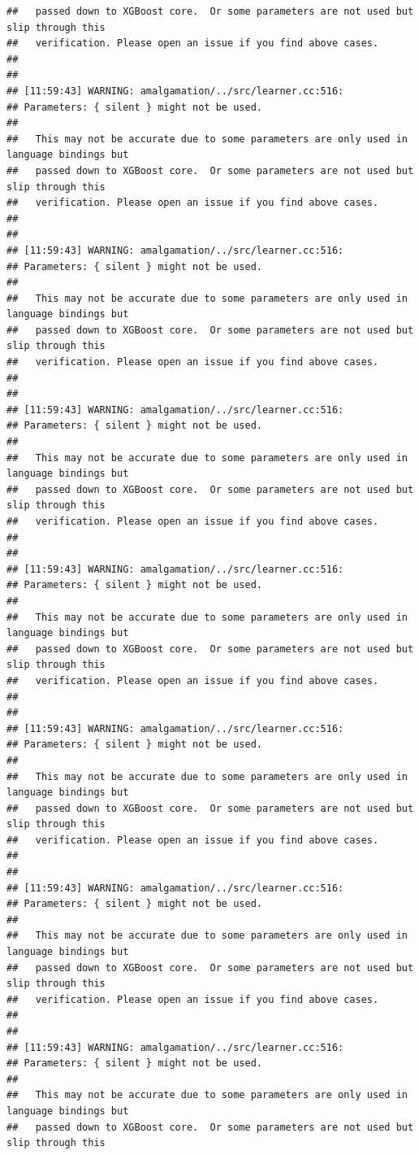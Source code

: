 \documentclass[AMS,STIX2COL]{WileyNJD-v2}\usepackage[]{graphicx}\usepackage[]{color}
\makeatletter
\newenvironment{kframe}{%
 \def\at@end@of@kframe{}%
 \ifinner\ifhmode%
  \def\at@end@of@kframe{\end{minipage}}%
  \begin{minipage}{\columnwidth}%
 \fi\fi%
 \def\FrameCommand##1{\hskip\@totalleftmargin \hskip-\fboxsep
 \colorbox{shadecolor}{##1}\hskip-\fboxsep
     \hskip-\linewidth \hskip-\@totalleftmargin \hskip\columnwidth}%
 \MakeFramed {\advance\hsize-\width
   \@totalleftmargin\z@ \linewidth\hsize
   \@setminipage}}%
 {\par\unskip\endMakeFramed%
 \at@end@of@kframe}
\newenvironment{knitrout}{}{} %
\makeatother
\begin{document}
\begin{knitrout}
\begin{kframe}
\begin{verbatim}
##   passed down to XGBoost core.  Or some parameters are not used but slip through this
##   verification. Please open an issue if you find above cases.
## 
## 
## [11:59:43] WARNING: amalgamation/../src/learner.cc:516: 
## Parameters: { silent } might not be used.
## 
##   This may not be accurate due to some parameters are only used in language bindings but
##   passed down to XGBoost core.  Or some parameters are not used but slip through this
##   verification. Please open an issue if you find above cases.
## 
## 
## [11:59:43] WARNING: amalgamation/../src/learner.cc:516: 
## Parameters: { silent } might not be used.
## 
##   This may not be accurate due to some parameters are only used in language bindings but
##   passed down to XGBoost core.  Or some parameters are not used but slip through this
##   verification. Please open an issue if you find above cases.
## 
## 
## [11:59:43] WARNING: amalgamation/../src/learner.cc:516: 
## Parameters: { silent } might not be used.
## 
##   This may not be accurate due to some parameters are only used in language bindings but
##   passed down to XGBoost core.  Or some parameters are not used but slip through this
##   verification. Please open an issue if you find above cases.
## 
## 
## [11:59:43] WARNING: amalgamation/../src/learner.cc:516: 
## Parameters: { silent } might not be used.
## 
##   This may not be accurate due to some parameters are only used in language bindings but
##   passed down to XGBoost core.  Or some parameters are not used but slip through this
##   verification. Please open an issue if you find above cases.
## 
## 
## [11:59:43] WARNING: amalgamation/../src/learner.cc:516: 
## Parameters: { silent } might not be used.
## 
##   This may not be accurate due to some parameters are only used in language bindings but
##   passed down to XGBoost core.  Or some parameters are not used but slip through this
##   verification. Please open an issue if you find above cases.
## 
## 
## [11:59:43] WARNING: amalgamation/../src/learner.cc:516: 
## Parameters: { silent } might not be used.
## 
##   This may not be accurate due to some parameters are only used in language bindings but
##   passed down to XGBoost core.  Or some parameters are not used but slip through this
##   verification. Please open an issue if you find above cases.
## 
## 
## [11:59:43] WARNING: amalgamation/../src/learner.cc:516: 
## Parameters: { silent } might not be used.
## 
##   This may not be accurate due to some parameters are only used in language bindings but
##   passed down to XGBoost core.  Or some parameters are not used but slip through this

\end{verbatim}
\end{kframe}
\end{knitrout}
\end{document}
